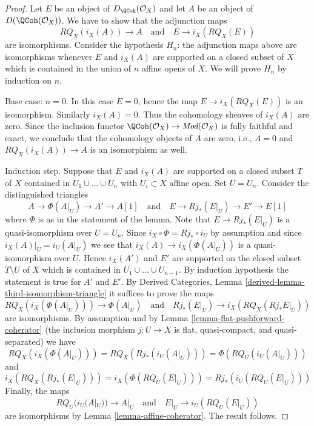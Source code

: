 \begin{proof}
Let $E$ be an object of $D_\QCoh(\mathcal{O}_X)$ and
let $A$ be an object of $D(\QCoh(\mathcal{O}_X))$.
We have to show that the adjunction maps
$$
RQ_X(i_X(A)) \to A
\quad\text{and}\quad
E \to i_X(RQ_X(E))
$$
are isomorphisms. Consider the hypothesis
$H_n$: the adjunction maps above are isomorphisms
whenever $E$ and $i_X(A)$
are supported on a closed subset of $X$ which
is contained in the union of $n$ affine opens of $X$.
We will prove $H_n$ by induction on $n$.

\medskip\noindent
Base case: $n = 0$. In this case $E = 0$, hence the map
$E \to i_X(RQ_X(E))$ is an isomorphism. Similarly $i_X(A) = 0$.
Thus the cohomology sheaves of $i_X(A)$ are zero. Since the inclusion
functor $\QCoh(\mathcal{O}_X) \to \textit{Mod}(\mathcal{O}_X)$
is fully faithful and exact, we conclude that the cohomology
objects of $A$ are zero, i.e., $A = 0$ and
$RQ_X(i_X(A)) \to A$ is an isomorphism as well.

\medskip\noindent
Induction step. Suppose that $E$ and $i_X(A)$ are supported on a
closed subset $T$ of $X$ contained in $U_1 \cup \ldots \cup U_n$
with $U_i \subset X$ affine open. Set $U = U_n$.
Consider the distinguished triangles
$$
A \to \Phi(A|_U) \to A' \to A[1]
\quad\text{and}\quad
E \to Rj_*(E|_U) \to E' \to E[1]
$$
where $\Phi$ is as in the statement of the lemma.
Note that $E \to Rj_*(E|_U)$ is a quasi-isomorphism over $U = U_n$.
Since $i_X \circ \Phi = Rj_* \circ i_U$ by assumption
and since $i_X(A)|_U = i_U(A|_U)$
we see that $i_X(A) \to i_X(\Phi(A|_U))$ is a quasi-isomorphism over $U$.
Hence $i_X(A')$ and $E'$ are supported on the closed
subset $T \setminus U$ of $X$ which is contained in
$U_1 \cup \ldots \cup U_{n - 1}$.
By induction hypothesis the statement is true for $A'$ and $E'$. By
Derived Categories, Lemma \ref{derived-lemma-third-isomorphism-triangle}
it suffices to prove the maps
$$
RQ_X(i_X(\Phi(A|_U))) \to \Phi(A|_U)
\quad\text{and}\quad
Rj_*(E|_U) \to i_X(RQ_X(Rj_*E|_U))
$$
are isomorphisms. By assumption and by
Lemma \ref{lemma-flat-pushforward-coherator}
(the inclusion morphism $j : U \to X$ is flat, quasi-compact, and
quasi-separated) we have
$$
RQ_X(i_X(\Phi(A|_U))) = RQ_X(Rj_*(i_U(A|_U))) = \Phi(RQ_U(i_U(A|_U)))
$$
and
$$
i_X(RQ_X(Rj_*(E|_U))) = i_X(\Phi(RQ_U(E|_U))) = Rj_*(i_U(RQ_U(E|_U)))
$$
Finally, the maps
$$
RQ_U(i_U(A|_U)) \to A|_U
\quad\text{and}\quad
E|_U \to i_U(RQ_U(E|_U))
$$
are isomorphisms by Lemma \ref{lemma-affine-coherator}. The result follows.
\end{proof}


